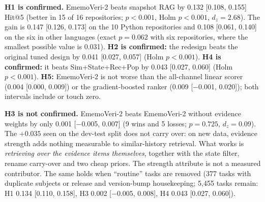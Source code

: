 \documentclass[conference]{IEEEtran}
\newcommand{\sys}{EmemoVeri}
\begin{document}
\textbf{H1 is confirmed.} \sys{}-2 beats snapshot RAG by 0.132 [0.108, 0.155] Hit@5 (better in 15 of 16 repositories; $p<0.001$, Holm $p<0.001$, $d_z=2.68$). The gain is 0.147 [0.126, 0.173] on the 10 Python repositories and 0.108 [0.061, 0.140] on the six in other languages (exact $p=0.062$ with six repositories, where the smallest possible value is 0.031). \textbf{H2 is confirmed:} the redesign beats the original tuned design by 0.041 [0.027, 0.057] (Holm $p<0.001$). \textbf{H4 is confirmed:} it beats Sim+State+Rec+Pop by 0.043 [0.027, 0.060] (Holm $p<0.001$). \textbf{H5:} \sys{}-2 is not worse than the all-channel linear scorer (0.004 [0.000, 0.009]) or the gradient-boosted ranker (0.009 [$-$0.001, 0.020]); both intervals include or touch zero.

\textbf{H3 is not confirmed.} \sys{}-2 beats \sys{}-2 without evidence weights by only 0.001 [$-$0.005, 0.007] (9 wins and 5 losses; $p=0.725$, $d_z=0.09$). The $+0.035$ seen on the dev-test split does not carry over: on new data, evidence strength adds nothing measurable to similar-history retrieval. What works is \emph{retrieving over the evidence items themselves}, together with the state filter, rename carry-over and two cheap priors. The strength attribute is not a measured contributor. The same holds when ``routine'' tasks are removed (377 tasks with duplicate subjects or release and version-bump housekeeping; 5{,}455 tasks remain: H1 0.134 [0.110, 0.158], H3 0.002 [$-$0.005, 0.008], H4 0.043 [0.027, 0.060]).

\begin{table}[t]\centering\footnotesize\setlength{\tabcolsep}{4pt}
\resizebox{0.97\textwidth}{!}{}
\caption{All systems, frozen, on the 16 fresh repositories (macro-average over repositories; koa is at ceiling for every system), and Hit@5 on the other sets. Held-out and multi-language results are post hoc for \sys{}-2.}
\label{tab:systems}
\end{table}

\begin{table}[t]\centering\footnotesize\setlength{\tabcolsep}{4pt}
\resizebox{0.97\textwidth}{!}{}
\caption{Contrasts stated in advance, fresh set (unit: repository, $n=16$). W/L: repositories where \sys{}-2 is better / worse (ties omitted). Last columns: $\Delta$Hit@5 on the 10 Python and the 6 other-language repositories. With 16 repositories the smallest exact $p$ is $3\times10^{-5}$.}
\label{tab:contrasts}
\end{table}
\end{document}
